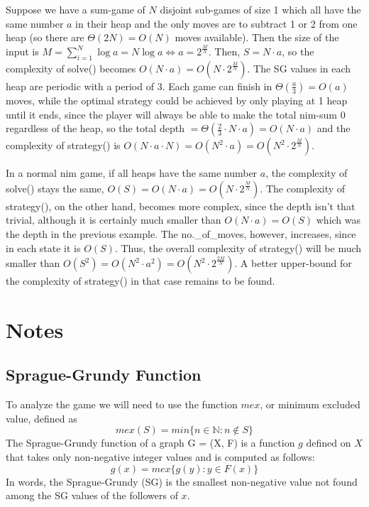 \documentclass{article}
\begin{document}
Suppose we have a sum-game of $N$ disjoint sub-games of size 1 which all have the same number $a$ in their heap and the only moves are to subtract 1 or 2 from one heap (so there are $\Theta(2N) = O(N)$ moves available). Then the size of the input is $M = \sum_{i=1}^N \log a = N \log a \Leftrightarrow a = 2^{\frac{M}{N}}$. Then, $S = N \cdot a$, so the complexity of solve() becomes $O(N \cdot a) = O(N \cdot 2^{\frac{M}{N}})$. The SG values in each heap are periodic with a period of 3. Each game can finish in $\Theta(\frac{a}{3}) = O(a)$ moves, while the optimal strategy could be achieved by only playing at 1 heap until it ends, since the player will always be able to make the total nim-sum 0 regardless of the heap, so the total depth $= \Theta(\frac{2}{3} \cdot N \cdot a) = O(N \cdot a)$ and the complexity of strategy() is $O(N \cdot a \cdot N) = O(N^2 \cdot a) = O(N^2 \cdot 2^{\frac{M}{N}})$.

In a normal nim game, if all heaps have the same number $a$, the complexity of solve() stays the same, $O(S) = O(N \cdot a) = O(N \cdot 2^{\frac{M}{N}})$. The complexity of strategy(), on the other hand, becomes more complex, since the depth isn't that trivial, although it is certainly much smaller than $O(N \cdot a) = O(S)$ which was the depth in the previous example. The no.{\_}of{\_}moves, however, increases, since in each state it is $O(S)$. Thus, the overall complexity of strategy() will be much smaller than $O(S^2) = O(N^2 \cdot a^2) = O(N^2 \cdot 2^{\frac{2M}{N}})$. A better upper-bound for the complexity of strategy() in that case remains to be found.

\section{Notes\cite{mit}}

\subsection{Sprague-Grundy Function}

To analyze the game we will need to use the function $mex$, or minimum excluded value, defined as
$$mex(S) = min{\{}n \in \mathbb{N} : n \notin S{\}}$$
The Sprague-Grundy function of a graph G = (X, F) is a function $g$ defined on $X$ that takes only non-negative integer values and is computed as follows:
$$g(x) = mex{\{}g(y) : y \in F(x){\}}$$
In words, the Sprague-Grundy (SG) is the smallest non-negative value not found among the SG values of the followers of $x$.
\end{document}
